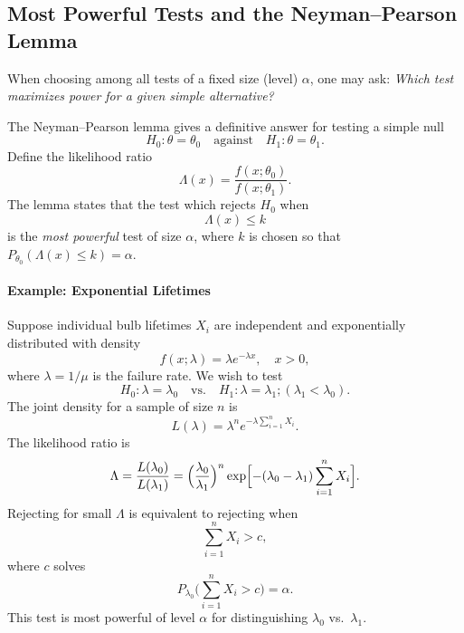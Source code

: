 \subsection{Most Powerful Tests and the Neyman--Pearson Lemma}
When choosing among all tests of a fixed size (level) $\alpha$, one may ask: \emph{Which test maximizes power for a given simple alternative?}

The Neyman--Pearson lemma gives a definitive answer for testing a simple null
\begin{equation}
H_0: \theta=\theta_0
\quad\text{against}\quad
H_1: \theta=\theta_1.
\end{equation}
Define the likelihood ratio
\begin{equation}
\Lambda(x) = \frac{f(x;\theta_0)}{f(x;\theta_1)}.
\end{equation}
The lemma states that the test which rejects $H_0$ when
\begin{equation}
\Lambda(x) \le k
\end{equation}
is the \emph{most powerful} test of size $\alpha$, where $k$ is chosen so that $P_{\theta_0}(\Lambda(x)\le k)=\alpha$.

\paragraph{Example: Exponential Lifetimes}
Suppose individual bulb lifetimes $X_i$ are independent and exponentially distributed with density
\begin{equation}
f(x;\lambda)=\lambda e^{-\lambda x}, \quad x>0,
\end{equation}
where $\lambda=1/\mu$ is the failure rate. We wish to test
\begin{equation}
H_0: \lambda=\lambda_0 \quad\text{vs.}\quad H_1: \lambda=\lambda_1 ;(\lambda_1<\lambda_0).
\end{equation}
The joint density for a sample of size $n$ is
\begin{equation}
L(\lambda) = \lambda^n e^{-\lambda\sum_{i=1}^n X_i}.
\end{equation}
The likelihood ratio is
\begin{equation}
\Lambda = \frac{L(\lambda_0)}{L(\lambda_1)}
= \Bigl(\frac{\lambda_0}{\lambda_1}\Bigr)^n
\exp\Bigl[-(\lambda_0-\lambda_1)\sum_{i=1}^n X_i\Bigr].
\end{equation}
Rejecting for small $\Lambda$ is equivalent to rejecting when
\begin{equation}
\sum_{i=1}^n X_i > c,
\end{equation}
where $c$ solves
\begin{equation}
P_{\lambda_0}\bigl(\sum_{i=1}^n X_i>c\bigr)=\alpha.
\end{equation}
This test is most powerful of level $\alpha$ for distinguishing $\lambda_0$ vs.\ $\lambda_1$.

